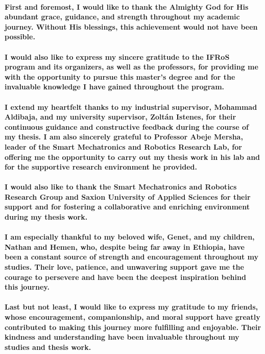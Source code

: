 \paragraph{\textnormal{First and foremost, I would like to thank the Almighty God for His abundant grace, guidance, and strength throughout my academic journey. Without His blessings, this achievement would not have been possible.}}

\paragraph{\textnormal{I would also like to express my sincere gratitude to the IFRoS program and its organizers, as well as the professors, for providing me with the opportunity to pursue this master's degree and for the invaluable knowledge I have gained throughout the program.}}

\paragraph{\textnormal{I extend my heartfelt thanks to my industrial supervisor, Mohammad Aldibaja, and my university supervisor, Zoltán Istenes, for their continuous guidance and constructive feedback during the course of my thesis. I am also sincerely grateful to Professor Abeje Mersha, leader of the Smart Mechatronics and Robotics Research Lab, for offering me the opportunity to carry out my thesis work in his lab and for the supportive research environment he provided.}}

\paragraph{\textnormal{I would also like to thank the Smart Mechatronics and Robotics Research Group and Saxion University of Applied Sciences for their support and for fostering a collaborative and enriching environment during my thesis work.}}

\paragraph{\textnormal{I am especially thankful to my beloved wife, Genet, and my children, Nathan and Hemen, who, despite being far away in Ethiopia, have been a constant source of strength and encouragement throughout my studies. Their love, patience, and unwavering support gave me the courage to persevere and have been the deepest inspiration behind this journey.}}

\paragraph{\textnormal{Last but not least, I would like to express my gratitude to my friends, whose encouragement, companionship, and moral support have greatly contributed to making this journey more fulfilling and enjoyable. Their kindness and understanding have been invaluable throughout my studies and thesis work.}}